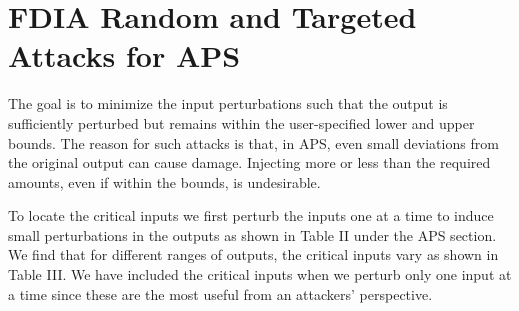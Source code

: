 \section{FDIA Random and Targeted Attacks for APS}
The goal is to minimize the input perturbations such that the output is sufficiently perturbed but remains within the user-specified lower and upper bounds. The reason for such attacks is that, in APS, even small deviations from the original output can cause damage. Injecting more or less than the required amounts, even if within the bounds, is undesirable.

To locate the critical inputs we first perturb the inputs one at a time to induce small perturbations in the outputs as shown in Table II under the APS section. We find that for different ranges of outputs, the critical inputs vary as shown in Table III. We have included the critical inputs when we perturb only one input at a time since these are the most useful from an attackers' perspective.







